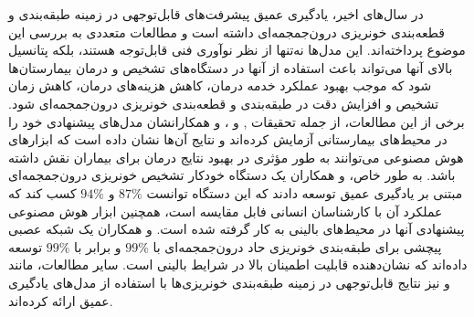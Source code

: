  در سال‌های اخیر، یادگیری عمیق پیشرفت‌های قابل‌توجهی در زمینه طبقه‌بندی و قطعه‌بندی خونریزی درون‌جمجمه‌ای داشته است و مطالعات متعددی به بررسی این موضوع پرداخته‌اند. این مدل‌ها نه‌تنها از نظر نوآوری فنی قابل‌توجه هستند، بلکه پتانسیل بالای آنها می‌تواند باعث استفاده از آنها در دستگاه‌های تشخیص و درمان بیمارستان‌ها شود که موجب بهبود عملکرد خدمه درمان، کاهش هزینه‌های درمان، کاهش زمان تشخیص و افزایش دقت در طبقه‌بندی و قطعه‌بندی خونریزی درون‌جمجمه‌ای شود. برخی از این مطالعات، از جمله تحقیقات
  \cite{titano2018automated}, \cite{arbabshirani2018advanced} و \cite{kuo2019expert}،
و همکارانشان مدل‌های پیشنهادی خود را در محیط‌های بیمارستانی آزمایش کرده‌اند و نتایج آن‌ها نشان داده است که ابزار‌های هوش مصنوعی می‌توانند به ‌طور مؤثری در بهبود نتایج درمان برای بیماران نقش داشته باشد. به طور خاص،  و همکاران یک دستگاه خودکار تشخیص خونریزی درون‌جمجمه‌ای مبتنی بر یادگیری عمیق توسعه دادند که این دستگاه توانست 
 \(87\%\) و 
  \(94\%\) کسب کند که عملکرد آن با کارشناسان انسانی فابل مقایسه است، همچنین ابزار هوش مصنوعی پیشنهادی آنها در محیط‌های بالینی به کار گرفته شده است.  و همکاران یک شبکه عصبی پیچشی برای طبقه‌بندی خونریزی حاد درون‌جمجمه‌ای با 
   \(99\%\) و  برابر با
 \(99\%\)
توسعه داده‌اند که نشان‌دهنده قابلیت اطمینان بالا در شرایط بالینی است. سایر مطالعات، مانند
 \cite{chang2018hybrid}
  و
   \cite{chilamkurthy2018deep}
    نیز نتایج قابل‌توجهی در زمینه طبقه‌بندی خونریزی‌ها با استفاده از مدل‌های یادگیری عمیق ارائه کرده‌اند.
 
